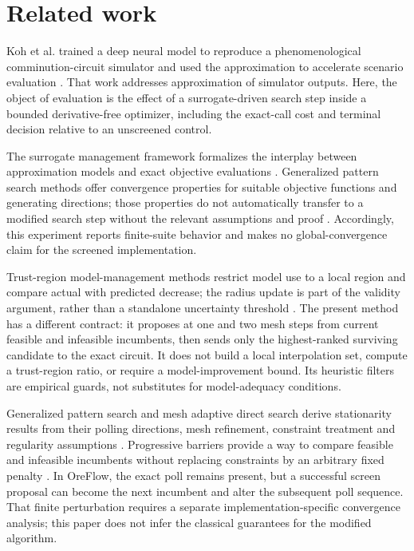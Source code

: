 \documentclass[10pt]{article}
\begin{document}
\section{Related work}
Koh et al. trained a deep neural model to reproduce a phenomenological comminution-circuit simulator and used the approximation to accelerate scenario evaluation \cite{Koh2021}. That work addresses approximation of simulator outputs. Here, the object of evaluation is the effect of a surrogate-driven search step inside a bounded derivative-free optimizer, including the exact-call cost and terminal decision relative to an unscreened control.

The surrogate management framework formalizes the interplay between approximation models and exact objective evaluations \cite{Booker1999}. Generalized pattern search methods offer convergence properties for suitable objective functions and generating directions; those properties do not automatically transfer to a modified search step without the relevant assumptions and proof \cite{Torczon1997,AudetDennis2006}. Accordingly, this experiment reports finite-suite behavior and makes no global-convergence claim for the screened implementation.

Trust-region model-management methods restrict model use to a local region and compare actual with predicted decrease; the radius update is part of the validity argument, rather than a standalone uncertainty threshold \cite{Booker1999,Marsden2004,ForresterKeane2009,Queipo2005}. The present method has a different contract: it proposes at one and two mesh steps from current feasible and infeasible incumbents, then sends only the highest-ranked surviving candidate to the exact circuit. It does not build a local interpolation set, compute a trust-region ratio, or require a model-improvement bound. Its heuristic filters are empirical guards, not substitutes for model-adequacy conditions.

Generalized pattern search and mesh adaptive direct search derive stationarity results from their polling directions, mesh refinement, constraint treatment and regularity assumptions \cite{Torczon1997,AudetDennis2003,AudetDennis2006,AbramsonAudet2006}. Progressive barriers provide a way to compare feasible and infeasible incumbents without replacing constraints by an arbitrary fixed penalty \cite{ProgressiveBarrier2009,FletcherLeyffer2002}. In OreFlow, the exact poll remains present, but a successful screen proposal can become the next incumbent and alter the subsequent poll sequence. That finite perturbation requires a separate implementation-specific convergence analysis; this paper does not infer the classical guarantees for the modified algorithm.
\end{document}
